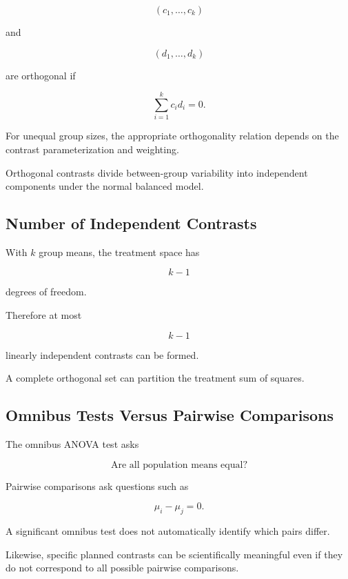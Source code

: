 \[
(c_1,\ldots,c_k)
\]

and

\[
(d_1,\ldots,d_k)
\]

are orthogonal if

\[
\boxed{
\sum_{i=1}^{k}
c_id_i
=
0.
}
\]

For unequal group sizes, the appropriate orthogonality relation depends
on the contrast parameterization and weighting.

Orthogonal contrasts divide between-group variability into independent
components under the normal balanced model.

\subsection{Number of Independent Contrasts}
\label{subsec:number-independent-contrasts}

With \(k\) group means, the treatment space has

\[
\boxed{
k-1
}
\]

degrees of freedom.

Therefore at most

\[
\boxed{
k-1
}
\]

linearly independent contrasts can be formed.

A complete orthogonal set can partition the treatment sum of squares.

\subsection{Omnibus Tests Versus Pairwise Comparisons}
\label{subsec:omnibus-versus-pairwise}

The omnibus ANOVA test asks

\[
\boxed{
\text{Are all population means equal?}
}
\]

Pairwise comparisons ask questions such as

\[
\boxed{
\mu_i-\mu_j=0.
}
\]

A significant omnibus test does not automatically identify which pairs
differ.

Likewise, specific planned contrasts can be scientifically meaningful
even if they do not correspond to all possible pairwise comparisons.

